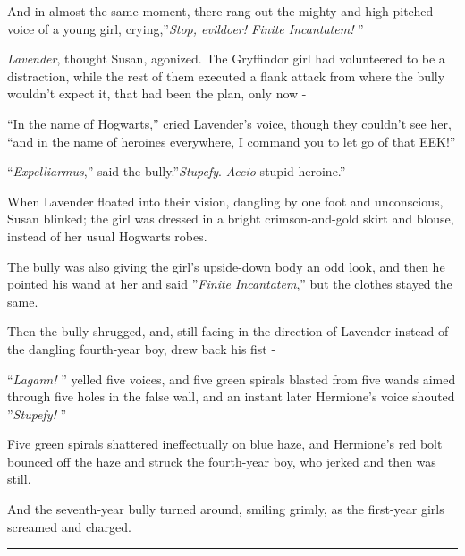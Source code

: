 And in almost the same moment, there rang out the mighty and
high-pitched voice of a young girl, crying,''\emph{Stop, evildoer!
Finite Incantatem!} ''

\emph{Lavender}, thought Susan, agonized. The Gryffindor girl had
volunteered to be a distraction, while the rest of them executed a flank
attack from where the bully wouldn't expect it, that had been the plan,
only now -

``In the name of Hogwarts,'' cried Lavender's voice, though they
couldn't see her, ``and in the name of heroines everywhere, I command
you to let go of that EEK!''

``\emph{Expelliarmus},'' said the bully.''\emph{Stupefy}. \emph{Accio}
stupid heroine.''

When Lavender floated into their vision, dangling by one foot and
unconscious, Susan blinked; the girl was dressed in a bright
crimson-and-gold skirt and blouse, instead of her usual Hogwarts robes.

The bully was also giving the girl's upside-down body an odd look, and
then he pointed his wand at her and said ''\emph{Finite Incantatem},''
but the clothes stayed the same.

Then the bully shrugged, and, still facing in the direction of Lavender
instead of the dangling fourth-year boy, drew back his fist -

``\emph{Lagann!} '' yelled five voices, and five green spirals blasted
from five wands aimed through five holes in the false wall, and an
instant later Hermione's voice shouted ''\emph{Stupefy!} ''

Five green spirals shattered ineffectually on blue haze, and Hermione's
red bolt bounced off the haze and struck the fourth-year boy, who jerked
and then was still.

And the seventh-year bully turned around, smiling grimly, as the
first-year girls screamed and charged.

\begin{center}\rule{3in}{0.4pt}\end{center}

